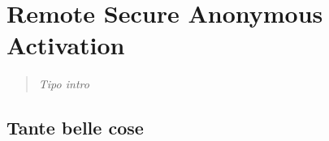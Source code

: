\documentclass[../tesi.tex]{subfiles}
\begin{document}
\chapter{Remote Secure Anonymous Activation}
\begin{quotation}
\emph{Tipo intro}
\end{quotation}

\section{Tante belle cose}
\end{document}
